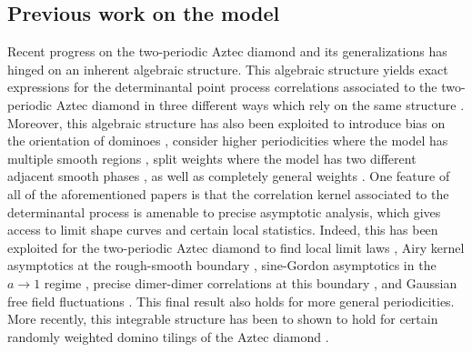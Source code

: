 \documentclass[11pt,twoside]{amsart}
\theoremstyle{plain}
\numberwithin{quest}{section}
\theoremstyle{remark}
\numberwithin{rem}{section}
\theoremstyle{definition}
\begin{document}
\subsection{Previous work on the model}

	Recent progress on the two-periodic Aztec diamond and its generalizations has hinged on an inherent algebraic structure.  This algebraic structure yields exact expressions for the determinantal point process correlations associated to the two-periodic Aztec diamond in three different ways \cite{CY14,DK21,BD19} which rely on the same structure \cite{CD23, KP25}.  Moreover, this algebraic structure has also been exploited to introduce bias on the orientation of dominoes \cite{BD22}, consider higher periodicities where the model has multiple smooth regions \cite{Ber21, BB23}, split weights where the model has two different adjacent smooth phases \cite{She25},  
    as well as completely general weights \cite{BdT24}. One feature of all of the aforementioned papers is that the correlation kernel associated to the determinantal process is amenable to precise asymptotic analysis, which gives access to limit shape curves and certain local statistics.  Indeed, this has been exploited for the two-periodic Aztec diamond to find local limit laws \cite{CJ16, DK21}, Airy kernel asymptotics at the rough-smooth boundary \cite{CJ16, BCJ18}, sine-Gordon asymptotics in the $a\to 1$ regime \cite{mason2022two}, precise dimer-dimer correlations at this boundary \cite{JM22}, and Gaussian free field fluctuations \cite{BN25}. This final result also holds for more general periodicities.  More recently, this integrable structure has been to shown to hold for certain randomly weighted domino tilings of the Aztec diamond \cite{DVP25}. 
	
\end{document}
